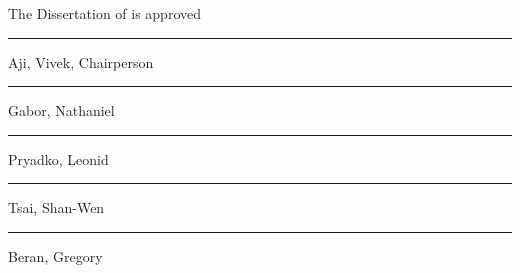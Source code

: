 \newcommand{\signatureblock}[1]{%
  \begin{minipage}{10cm}
    \hrule\smallskip #1
  \end{minipage}
}

\clearpage
\thispagestyle{empty}
\centering
\vspace*{-\toptafiddle}

The Dissertation of \theauthor is approved

\vfill

\signatureblock{Aji, Vivek, Chairperson}
\vfill
\signatureblock{Gabor, Nathaniel}
\vfill
\signatureblock{Pryadko, Leonid }
\vfill
\signatureblock{Tsai, Shan-Wen}
\vfill
\signatureblock{Beran, Gregory}

\vfill

\textsc{\theuniversity}

\enlargethispage{\bottafiddle}
\clearpage
